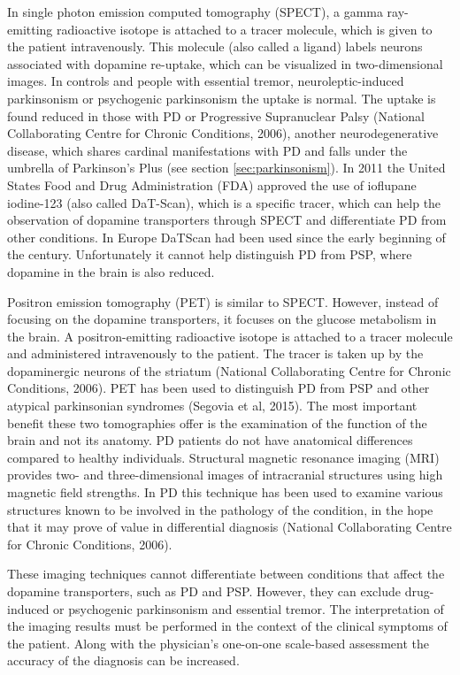 In single photon emission computed tomography (\gls{SPECT}), a gamma ray-emitting radioactive isotope is attached to a tracer molecule, which is given to the patient intravenously. This molecule (also called a ligand) labels neurons associated with dopamine re-uptake, which can be visualized in two-dimensional images. In controls and people with essential tremor, neuroleptic-induced parkinsonism or psychogenic parkinsonism the uptake is normal. The uptake is found reduced in those with \gls{PD} or Progressive Supranuclear Palsy (National Collaborating Centre for Chronic Conditions, 2006), another neurodegenerative disease, which shares cardinal manifestations with \gls{PD} and falls under the umbrella of Parkinson's Plus (see section \ref{sec:parkinsonism}). In 2011 the United States Food and Drug Administration (\gls{FDA}) approved the use of ioflupane iodine-123 (also called DaT-Scan), which is a specific tracer, which can help the observation of dopamine transporters through \gls{SPECT} and differentiate \gls{PD} from other conditions. In Europe DaTScan had been used since the early beginning of the century. Unfortunately it cannot help distinguish \gls{PD} from \gls{PSP}, where dopamine in the brain is also reduced.

Positron emission tomography (\gls{PET}) is similar to \gls{SPECT}. However, instead of focusing on the dopamine transporters, it focuses on the glucose metabolism in the brain. A positron-emitting radioactive isotope is attached to a tracer molecule and administered intravenously to the patient. The tracer is taken up by the dopaminergic neurons of the striatum (National Collaborating Centre for Chronic Conditions, 2006). \gls{PET} has been used to distinguish \gls{PD} from \gls{PSP} and other atypical parkinsonian syndromes (Segovia et al, 2015). The most important benefit these two tomographies offer is the examination of the function of the brain and not its anatomy. \gls{PD} patients do not have anatomical differences compared to healthy individuals. Structural magnetic resonance imaging (\gls{MRI}) provides two- and three-dimensional images of intracranial structures using high magnetic field strengths. In \gls{PD} this technique has been used to examine various structures known to be involved in the pathology of the condition, in the hope that it may prove of value in differential diagnosis (National Collaborating Centre for Chronic Conditions, 2006).

These imaging techniques cannot differentiate between conditions that affect the dopamine transporters, such as \gls{PD} and \gls{PSP}. However, they can exclude drug-induced or psychogenic parkinsonism and essential tremor. The interpretation of the imaging results must be performed in the context of the clinical symptoms of the patient. Along with the physician's one-on-one scale-based assessment the accuracy of the diagnosis can be increased. 

